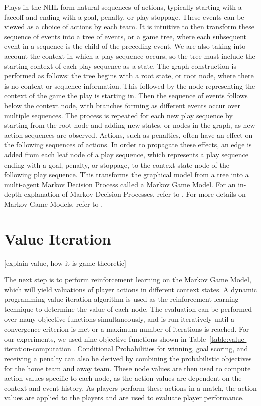 \documentclass[]{article}
\begin{document}
Plays in the NHL form natural sequences of actions, typically starting with a faceoff and ending with a goal, penalty, or play stoppage. These events can be viewed as a choice of actions by each team. It is intuitive to then transform these sequence of events into a tree of events, or a game tree, where each subsequent event in a sequence is the child of the preceding event. We are also taking into account the context in which a play sequence occurs, so the tree must include the starting context of each play sequence as a state. The graph construction is performed as follows: the tree begins with a root state, or root node, where there is no context or sequence information. This followed by the node representing the context of the game the play is starting in. Then the sequence of events follows below the context node, with branches forming as different events occur over multiple sequences. The process is repeated for each new play sequence by starting from the root node and adding new states, or nodes in the graph, as new action sequences are observed. Actions, such as penalties, often have an effect on the following sequences of actions. In order to propagate these effects, an edge is added from each leaf node of a play sequence, which represents a play sequence ending with a goal, penalty, or stoppage, to the context state node of the following play sequence. This transforms the graphical model from a tree into a multi-agent Markov Decision Process called a Markov Game Model. For an in-depth explanation of Markov Decision Processes, refer to \citep{Russell2010}. For more details on Markov Game Models, refer to \citep{Littman1994}.

\section{Value Iteration}
[explain value, how it is game-theoretic]

The next step is to perform reinforcement learning on the Markov Game Model, which will yield valuations of player actions in different context states. A dynamic programming value iteration algorithm is used as the reinforcement learning technique to determine the value of each node. The evaluation can be performed over many objective functions simultaneously, and is run iteratively until a convergence criterion is met or a maximum number of iterations is reached. For our experiments, we used nine objective functions shown in Table~\ref{table:value-iteration-computation}. Conditional Probabilities for winning, goal scoring, and receiving a penalty can also be derived by combining the probabilistic objectives for the home team and away team. These node values are then used to compute action values specific to each node, as the action values are dependent on the context and event history. As players perform these actions in a match, the action values are applied to the players and are used to evaluate player performance.
\end{document}
